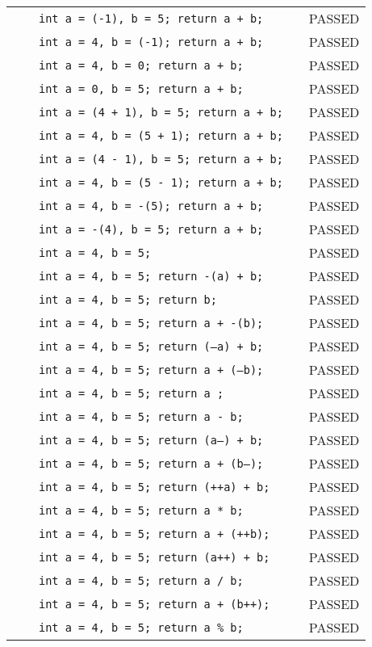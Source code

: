 \begin{longtable}{|p{1cm}|p{3cm}|p{5.5cm}|p{2.5cm}|p{1.5cm}|}
& & \texttt{int a = (-1), b = 5; return a + b;} &  & PASSED\\
& & \texttt{int a = 4, b = (-1); return a + b;} &  & PASSED\\
& & \texttt{int a = 4, b = 0; return a + b;} &  & PASSED\\
& & \texttt{int a = 0, b = 5; return a + b;} &  & PASSED\\
& & \texttt{int a = (4 + 1), b = 5; return a + b;} &  & PASSED\\
& & \texttt{int a = 4, b = (5 + 1); return a + b;} &  & PASSED\\
& & \texttt{int a = (4 - 1), b = 5; return a + b;} &  & PASSED\\
& & \texttt{int a = 4, b = (5 - 1); return a + b;} &  & PASSED\\
& & \texttt{int a = 4, b = -(5); return a + b;} &  & PASSED\\
& & \texttt{int a = -(4), b = 5; return a + b;} &  & PASSED\\
& & \texttt{int a = 4, b = 5;} &  & PASSED\\
& & \texttt{int a = 4, b = 5; return -(a) + b;} &  & PASSED\\
& & \texttt{int a = 4, b = 5; return  b;} &  & PASSED\\
& & \texttt{int a = 4, b = 5; return a + -(b);} &  & PASSED\\
& & \texttt{int a = 4, b = 5; return (--a) + b;} &  & PASSED\\
& & \texttt{int a = 4, b = 5; return a + (--b);} &  & PASSED\\
& & \texttt{int a = 4, b = 5; return a ;} &  & PASSED\\
& & \texttt{int a = 4, b = 5; return a - b;} &  & PASSED\\
& & \texttt{int a = 4, b = 5; return (a--) + b;} &  & PASSED\\
& & \texttt{int a = 4, b = 5; return a + (b--);} &  & PASSED\\
& & \texttt{int a = 4, b = 5; return (++a) + b;} &  & PASSED\\
& & \texttt{int a = 4, b = 5; return a * b;} &  & PASSED\\
& & \texttt{int a = 4, b = 5; return a + (++b);} &  & PASSED\\
& & \texttt{int a = 4, b = 5; return (a++) + b;} &  & PASSED\\
& & \texttt{int a = 4, b = 5; return a / b;} &  & PASSED\\
& & \texttt{int a = 4, b = 5; return a + (b++);} &  & PASSED\\
& & \texttt{int a = 4, b = 5; return a \% b;} &  & PASSED\\
\hline

\end{longtable}
\normalsize
